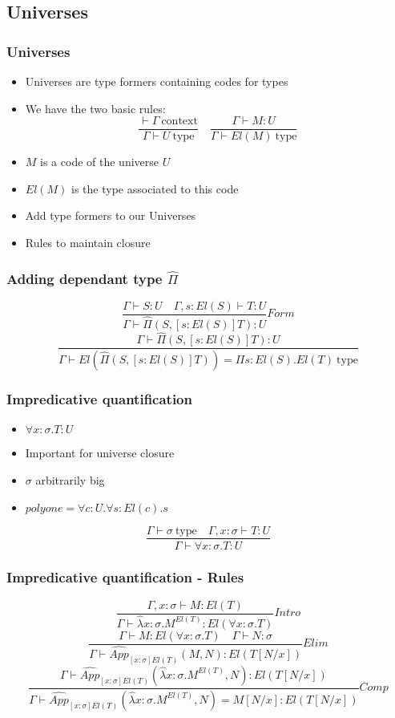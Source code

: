 \documentclass[aspectratio=169]{beamer}
\newcommand{\cntxt}{\ \mathrm{context}}
\newcommand{\typ}{\ \mathrm{type}}
\newcommand{\C}{Comp}
\newcommand{\Intro}{Intro}
\newcommand{\F}{Form}
\newcommand{\E}{Elim}
\newcommand{\Pich}{\hat{\Pi}}
\newcommand{\Appch}[2]{\hat{App}_{[x:\sigma]El(T)}(#1,#2)}
\newcommand{\lambdach}{\hat{\lambda} x:\sigma.M^{El(T)}}
\newcommand{\Gamdash}{\Gamma\vdash}
\begin{document}
    \subsection{Universes}
    \begin{frame}
        \frametitle{Universes}
        \begin{itemize}
            \item Universes are type formers containing codes for types
            \item We have the two basic rules:
            $$\frac{\vdash \Gamma \cntxt}{\Gamma \vdash U \typ}\quad\frac{\Gamma \vdash M:U}{\Gamdash El(M)\typ}$$
            \item $M$ is a code of the universe $U$
            \item $El(M)$ is the type associated to this code
            \item Add type formers to our Universes
            \item Rules to maintain closure
        \end{itemize}
    \end{frame}
    \begin{frame}
        \frametitle{Adding dependant type $\Pich$}
        $$\frac{\Gamma \vdash S:U\quad \Gamma,s:El(S)\vdash T:U}{\Gamma \vdash \Pich(S,[s:El(S)]T):U}\F$$
        \vspace{15pt}
        $$\frac{\Gamdash\Pich(S,[s:El(S)]T):U}{\Gamdash El(\Pich(S,[s:El(S)]T)) = \Pi s:El(S).El(T) \typ}$$
    \end{frame}
    \begin{frame}
        \frametitle{Impredicative quantification}
        \begin{itemize}
            \item $\forall x:\sigma.T:U$
            \item Important for universe closure
            \item $\sigma$ arbitrarily big
            \item $polyone = \forall c:U.\forall s:El(c).s$
        \end{itemize}
        \vspace{15pt}
        $$\frac{\Gamdash\sigma\typ\quad\Gamma,x:\sigma\vdash T:U}{\Gamdash\forall x:\sigma.T:U}$$
    \end{frame}
    \begin{frame}
        \frametitle{Impredicative quantification - Rules}
        $$\frac{\Gamma,x:\sigma\vdash M:El(T)}{\Gamdash\lambdach:El(\forall x:\sigma.T)}\Intro$$
        \vspace{10pt}
        $$\frac{\Gamdash M:El(\forall x:\sigma.T)\quad\Gamdash N:\sigma}{\Gamdash\Appch{M}{N}:El(T[N/x])}\E$$
        \vspace{10pt}
        $$\frac{\Gamdash\Appch{\lambdach}{N}:El(T[N/x])}{\Gamdash\Appch{\lambdach}{N}=M[N/x]:El(T[N/x])}\C$$
    \end{frame}
\end{document}
